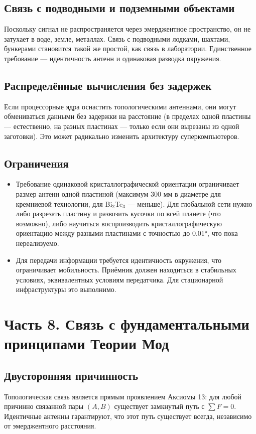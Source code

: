 \documentclass[a4paper,12pt]{article}
\begin{document}
\subsection{Связь с подводными и подземными объектами}
Поскольку сигнал не распространяется через эмерджентное пространство, он не затухает в воде, земле, металлах. Связь с подводными лодками, шахтами, бункерами становится такой же простой, как связь в лаборатории. Единственное требование — идентичность антенн и одинаковая разводка окружения.

\subsection{Распределённые вычисления без задержек}
Если процессорные ядра оснастить топологическими антеннами, они могут обмениваться данными без задержки на расстояние (в пределах одной пластины — естественно, на разных пластинах — только если они вырезаны из одной заготовки). Это может радикально изменить архитектуру суперкомпьютеров.

\subsection{Ограничения}
\begin{itemize}
    \item Требование одинаковой кристаллографической ориентации ограничивает размер антенн одной пластиной (максимум 300 мм в диаметре для кремниевой технологии, для Bi\(_2\)Te\(_3\) — меньше). Для глобальной сети нужно либо разрезать пластину и развозить кусочки по всей планете (что возможно), либо научиться воспроизводить кристаллографическую ориентацию между разными пластинами с точностью до 0.01°, что пока нереализуемо.
    \item Для передачи информации требуется идентичность окружения, что ограничивает мобильность. Приёмник должен находиться в стабильных условиях, эквивалентных условиям передатчика. Для стационарной инфраструктуры это выполнимо.
\end{itemize}

\section*{Часть 8. Связь с фундаментальными принципами Теории Мод}

\subsection{Двусторонняя причинность}
Топологическая связь является прямым проявлением Аксиомы 13: для любой причинно связанной пары \((A, B)\) существует замкнутый путь с \(\sum F = 0\). Идентичные антенны гарантируют, что этот путь существует всегда, независимо от эмерджентного расстояния.
\end{document}
